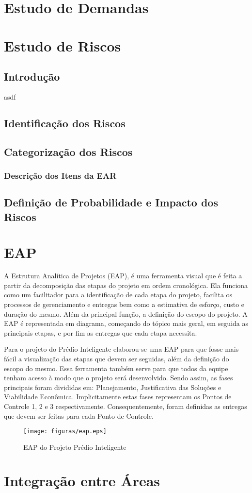 \chapter{Estudo de Demandas}

\chapter{Estudo de Riscos}
\section{Introdução}
asdf
\section{Identificação dos Riscos}
\section{Categorização dos Riscos}
\subsection{Descrição dos Itens da EAR}
\section{Definição de Probabilidade e Impacto dos Riscos}



\chapter{EAP}
A Estrutura Analítica de Projetos (EAP), é uma ferramenta visual que é feita a partir da decomposição das etapas do projeto em ordem cronológica. Ela funciona como um facilitador para a identificação de cada etapa do projeto, facilita os processos de gerenciamento e entregas bem como a estimativa de esforço, custo e duração do mesmo. Além da principal função, a definição do escopo do projeto. A EAP é representada em diagrama, começando do tópico mais geral, em seguida as principais etapas, e por fim as entregas que cada etapa necessita.

Para o projeto do Prédio Inteligente elaborou-se uma EAP para que fosse mais fácil a visualização das etapas que devem ser seguidas, além da definição do escopo do mesmo. Essa ferramenta também serve para que todos da equipe tenham acesso à modo que o projeto será desenvolvido. Sendo assim, as fases principais foram divididas em: Planejamento, Justificativa das Soluções e Viabilidade Econômica. Implicitamente estas fases representam os Pontos de Controle 1, 2 e 3 respectivamente. Consequentemente, foram definidas as entregas que devem ser feitas para cada Ponto de Controle.
 \begin{figure}[!h]
 	\centering
 	\texttt{[image: figuras/eap.eps]}
 	\caption{EAP do Projeto Prédio Inteligente}
 	\label{fig01}
 \end{figure}

\chapter{Integração entre Áreas}
